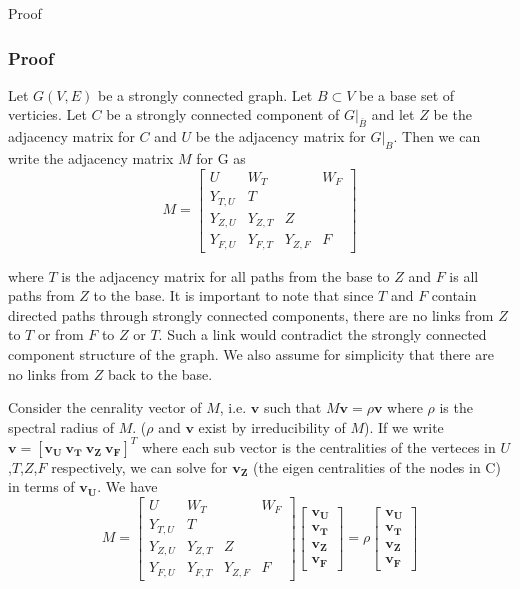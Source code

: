 \documentclass{paper}
\begin{document}
Proof

\subsubsection*{Proof}

Let $G(V,E)$ be a strongly connected graph. Let $B \subset V$ be a base set of verticies. Let $C$ be a strongly connected component of $G|_{\overline{B}}$ and let $Z$ be the adjacency matrix for $C$ and $U$ be the adjacency matrix for $G|_{B}$. Then we can write the adjacency matrix $M$ for G as
\[M=
\begin{bmatrix}
U & W_{T}&  & W_{F} \\
Y_{T,U} & T & & \\
Y_{Z,U} & Y_{Z,T} & Z & \\
Y_{F,U} & Y_{F,T} & Y_{Z,F} & F
\end{bmatrix}
\]

where $T$ is the adjacency matrix for all paths from the base to $Z$  and $F$ is all paths from $Z$ to the base. It is important to note that since $T$ and $F$ contain directed paths through strongly connected components, there are no links from $Z$ to $T$ or from $F$ to $Z$ or $T$. Such a link would contradict the strongly connected component structure of the graph. We also assume for simplicity that there are no links from $Z$ back to the base.

Consider the cenrality vector of $M$, i.e. $\mathbf{v}$ such that $M\mathbf{v} = \rho \mathbf{v}$ where $\rho$ is the spectral radius of $M$. ($\rho$ and $\mathbf{v}$ exist by irreducibility of $M$). If we write $\mathbf{v} = [\mathbf{v_U} \ \mathbf{v_T}\  \mathbf{v_Z} \  \mathbf{v_F}]^T$ where each sub vector is the centralities of the verteces in $U$,$T$,$Z$,$F$ respectively, we can solve for $\mathbf{v_Z}$ (the eigen centralities of the nodes in C) in terms of $\mathbf{v_U}$. We have  
\[M=
\begin{bmatrix}
U & W_{T}&  & W_{F} \\
Y_{T,U} & T & & \\
Y_{Z,U} & Y_{Z,T} & Z & \\
Y_{F,U} & Y_{F,T} & Y_{Z,F} & F
\end{bmatrix}
\begin{bmatrix}
\mathbf{v_U} \\
\mathbf{v_T}\\
\mathbf{v_Z} \\
\mathbf{v_F}
\end{bmatrix}
= 
\rho \begin{bmatrix}
\mathbf{v_U} \\
\mathbf{v_T}\\
\mathbf{v_Z} \\
\mathbf{v_F}
\end{bmatrix}
\]
\end{document}
